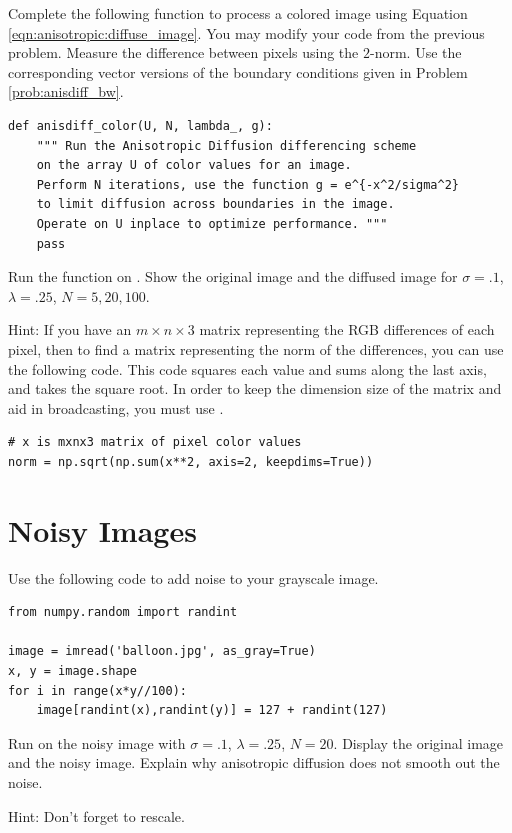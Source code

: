 \begin{problem}
Complete the following function to process a colored image using Equation \eqref{eqn:anisotropic:diffuse_image}.
You may modify your code from the previous problem.
Measure the difference between pixels using the $2$-norm.
Use the corresponding vector versions of the boundary conditions given in Problem \ref{prob:anisdiff_bw}.

\begin{lstlisting}
def anisdiff_color(U, N, lambda_, g):
    """ Run the Anisotropic Diffusion differencing scheme
    on the array U of color values for an image.
    Perform N iterations, use the function g = e^{-x^2/sigma^2}
    to limit diffusion across boundaries in the image.
    Operate on U inplace to optimize performance. """
    pass
\end{lstlisting}
Run the function on .
Show the original image and the diffused image for $\sigma = .1$, $\lambda = .25$, $N = 5, 20, 100$.

Hint: If you have an $m \times n \times 3$ matrix representing the RGB differences of each pixel, then to find a matrix representing the norm of the differences, you can use the following code.
This code squares each value and sums along the last axis, and takes the square root.
In order to keep the dimension size of the matrix and aid in broadcasting, you must use .

\begin{lstlisting}
# x is mxnx3 matrix of pixel color values
norm = np.sqrt(np.sum(x**2, axis=2, keepdims=True))
\end{lstlisting}

\end{problem}

\newpage
\section*{Noisy Images}

\begin{problem}
Use the following code to add noise to your grayscale image.

\begin{lstlisting}
from numpy.random import randint

image = imread('balloon.jpg', as_gray=True)
x, y = image.shape
for i in range(x*y//100):
	image[randint(x),randint(y)] = 127 + randint(127)
\end{lstlisting}

Run  on the noisy image with $\sigma=.1$, $\lambda=.25$, $N=20$.
Display the original image and the noisy image.
Explain why anisotropic diffusion does not smooth out the noise.

Hint: Don't forget to rescale.
\end{problem}


